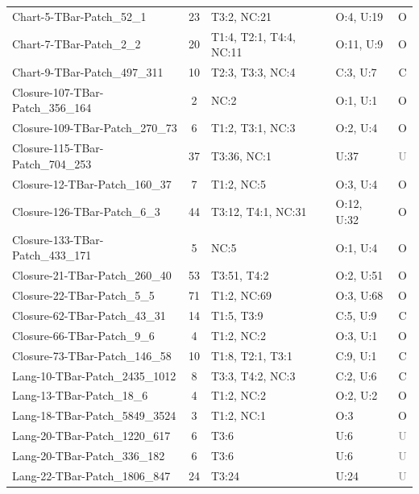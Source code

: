 \begin{table}[t]
\begin{tabular}{l|c|l|l|c}
Chart-5-TBar-Patch\_52\_1 & 23 & T3:2, NC:21 & O:4, U:19 & \textcolor{green!60!black}{O} \\
Chart-7-TBar-Patch\_2\_2 & 20 & T1:4, T2:1, T4:4, NC:11 & O:11, U:9 & \textcolor{green!60!black}{O} \\
Chart-9-TBar-Patch\_497\_311 & 10 & T2:3, T3:3, NC:4 & C:3, U:7 & \textcolor{green!60!black}{C} \\
Closure-107-TBar-Patch\_356\_164 & 2 & NC:2 & O:1, U:1 & \textcolor{green!60!black}{O} \\
Closure-109-TBar-Patch\_270\_73 & 6 & T1:2, T3:1, NC:3 & O:2, U:4 & \textcolor{green!60!black}{O} \\
Closure-115-TBar-Patch\_704\_253 & 37 & T3:36, NC:1 & U:37 & \textcolor{gray}{U} \\
Closure-12-TBar-Patch\_160\_37 & 7 & T1:2, NC:5 & O:3, U:4 & \textcolor{green!60!black}{O} \\
Closure-126-TBar-Patch\_6\_3 & 44 & T3:12, T4:1, NC:31 & O:12, U:32 & \textcolor{green!60!black}{O} \\
Closure-133-TBar-Patch\_433\_171 & 5 & NC:5 & O:1, U:4 & \textcolor{green!60!black}{O} \\
Closure-21-TBar-Patch\_260\_40 & 53 & T3:51, T4:2 & O:2, U:51 & \textcolor{green!60!black}{O} \\
Closure-22-TBar-Patch\_5\_5 & 71 & T1:2, NC:69 & O:3, U:68 & \textcolor{green!60!black}{O} \\
Closure-62-TBar-Patch\_43\_31 & 14 & T1:5, T3:9 & C:5, U:9 & \textcolor{green!60!black}{C} \\
Closure-66-TBar-Patch\_9\_6 & 4 & T1:2, NC:2 & O:3, U:1 & \textcolor{green!60!black}{O} \\
Closure-73-TBar-Patch\_146\_58 & 10 & T1:8, T2:1, T3:1 & C:9, U:1 & \textcolor{green!60!black}{C} \\
Lang-10-TBar-Patch\_2435\_1012 & 8 & T3:3, T4:2, NC:3 & C:2, U:6 & \textcolor{green!60!black}{C} \\
Lang-13-TBar-Patch\_18\_6 & 4 & T1:2, NC:2 & O:2, U:2 & \textcolor{green!60!black}{O} \\
Lang-18-TBar-Patch\_5849\_3524 & 3 & T1:2, NC:1 & O:3 & \textcolor{green!60!black}{O} \\
Lang-20-TBar-Patch\_1220\_617 & 6 & T3:6 & U:6 & \textcolor{gray}{U} \\
Lang-20-TBar-Patch\_336\_182 & 6 & T3:6 & U:6 & \textcolor{gray}{U} \\
Lang-22-TBar-Patch\_1806\_847 & 24 & T3:24 & U:24 & \textcolor{gray}{U} \\

\end{tabular}
\end{table}

